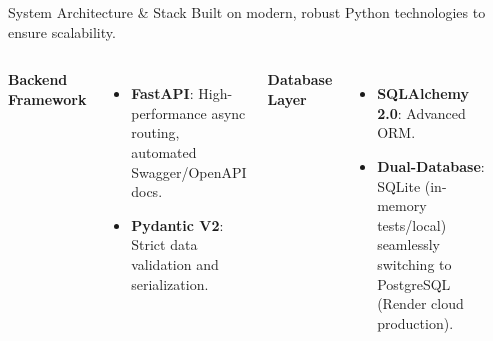 \documentclass[mathserif,aspectratio=169]{beamer}
\begin{document}
\begin{frame}{System Architecture \& Stack}
    Built on modern, robust Python technologies to ensure scalability.
    
    \vspace{0.3cm}
    \begin{columns}
        \textbf{Backend Framework}
        \begin{itemize}
            \item \textbf{FastAPI}: High-performance async routing, automated Swagger/OpenAPI docs.
            \item \textbf{Pydantic V2}: Strict data validation and serialization.
        \end{itemize}
        
        \vspace{0.3cm}
        \textbf{Database Layer}
        \begin{itemize}
            \item \textbf{SQLAlchemy 2.0}: Advanced ORM.
            \item \textbf{Dual-Database}: SQLite (in-memory tests/local) seamlessly switching to PostgreSQL (Render cloud production).
        \end{itemize}
        
        \begin{center}
        \end{center}
    \end{columns}
\end{frame}
\end{document}
